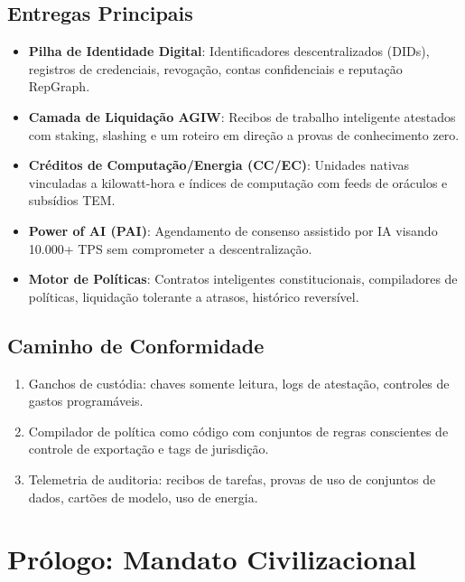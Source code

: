 \documentclass[11pt]{article}
\begin{document}
\subsection{Entregas Principais}
\begin{itemize}[noitemsep]
  \item \textbf{Pilha de Identidade Digital}: Identificadores descentralizados (DIDs), registros de credenciais, revogação, contas confidenciais e reputação RepGraph.
  \item \textbf{Camada de Liquidação AGIW}: Recibos de trabalho inteligente atestados com staking, slashing e um roteiro em direção a provas de conhecimento zero.
  \item \textbf{Créditos de Computação/Energia (CC/EC)}: Unidades nativas vinculadas a kilowatt-hora e índices de computação com feeds de oráculos e subsídios TEM.
  \item \textbf{Power of AI (PAI)}: Agendamento de consenso assistido por IA visando 10.000+ TPS sem comprometer a descentralização.
  \item \textbf{Motor de Políticas}: Contratos inteligentes constitucionais, compiladores de políticas, liquidação tolerante a atrasos, histórico reversível.
\end{itemize}

\subsection{Caminho de Conformidade}
\begin{enumerate}[noitemsep]
  \item Ganchos de custódia: chaves somente leitura, logs de atestação, controles de gastos programáveis.
  \item Compilador de política como código com conjuntos de regras conscientes de controle de exportação e tags de jurisdição.
  \item Telemetria de auditoria: recibos de tarefas, provas de uso de conjuntos de dados, cartões de modelo, uso de energia.
\end{enumerate}

\section{Prólogo: Mandato Civilizacional}
\end{document}
